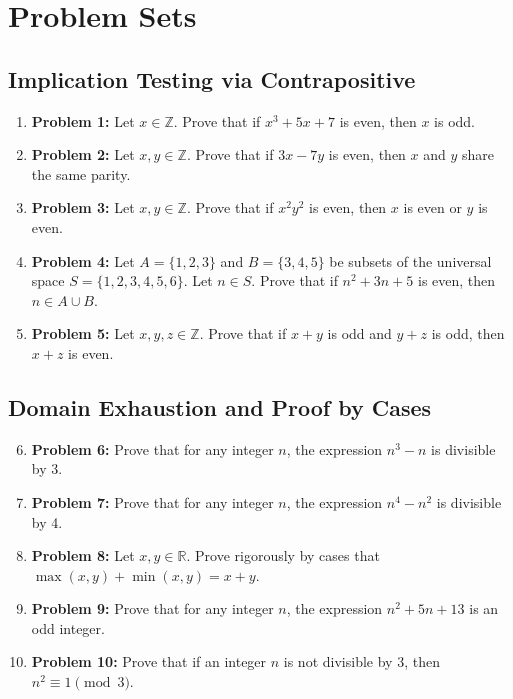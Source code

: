 \documentclass[11pt]{article}
\begin{document}
\newpage

\section{Problem Sets}
\label{sec:problems}

\subsection{Implication Testing via Contrapositive}
\begin{enumerate}
    \item \textbf{Problem 1:} Let $x \in \mathbb{Z}$. Prove that if $x^3 + 5x + 7$ is even, then $x$ is odd.
    \item \textbf{Problem 2:} Let $x, y \in \mathbb{Z}$. Prove that if $3x - 7y$ is even, then $x$ and $y$ share the same parity.
    \item \textbf{Problem 3:} Let $x, y \in \mathbb{Z}$. Prove that if $x^2 y^2$ is even, then $x$ is even or $y$ is even.
    \item \textbf{Problem 4:} Let $A = \{1, 2, 3\}$ and $B = \{3, 4, 5\}$ be subsets of the universal space $S = \{1, 2, 3, 4, 5, 6\}$. Let $n \in S$. Prove that if $n^2 + 3n + 5$ is even, then $n \in A \cup B$.
    \item \textbf{Problem 5:} Let $x, y, z \in \mathbb{Z}$. Prove that if $x+y$ is odd and $y+z$ is odd, then $x+z$ is even.
\end{enumerate}

\subsection{Domain Exhaustion and Proof by Cases}
\begin{enumerate}
    \setcounter{enumi}{5}
    \item \textbf{Problem 6:} Prove that for any integer $n$, the expression $n^3 - n$ is divisible by 3.
    \item \textbf{Problem 7:} Prove that for any integer $n$, the expression $n^4 - n^2$ is divisible by 4.
    \item \textbf{Problem 8:} Let $x, y \in \mathbb{R}$. Prove rigorously by cases that $\max(x, y) + \min(x, y) = x + y$.
    \item \textbf{Problem 9:} Prove that for any integer $n$, the expression $n^2 + 5n + 13$ is an odd integer.
    \item \textbf{Problem 10:} Prove that if an integer $n$ is not divisible by 3, then $n^2 \equiv 1 \pmod 3$.
\end{enumerate}
\end{document}
